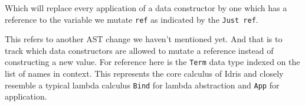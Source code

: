 \documentclass[
]{article}
\newenvironment{Shaded}{}{}
\newcommand{\CommentTok}[1]{\textcolor[rgb]{0.38,0.63,0.69}{\textit{#1}}}
\newcommand{\DataTypeTok}[1]{\textcolor[rgb]{0.56,0.13,0.00}{#1}}
\newcommand{\FunctionTok}[1]{\textcolor[rgb]{0.02,0.16,0.49}{#1}}
\newcommand{\KeywordTok}[1]{\textcolor[rgb]{0.00,0.44,0.13}{\textbf{#1}}}
\newcommand{\NormalTok}[1]{#1}
\newcommand{\OperatorTok}[1]{\textcolor[rgb]{0.40,0.40,0.40}{#1}}
\newcommand{\OtherTok}[1]{\textcolor[rgb]{0.00,0.44,0.13}{#1}}
\begin{document}
\begin{Shaded}
\end{Shaded}

Which will replace every application of a data constructor by one which
has a reference to the variable we mutate \texttt{ref} as indicated by
the \texttt{Just\ ref}.

This refers to another AST change we haven't mentioned yet. And that is
to track which data constructors are allowed to mutate a reference
instead of constructing a new value. For reference here is the
\texttt{Term} data type indexed on the list of names in context. This
represents the core calculus of Idris and closely resemble a typical
lambda calculus \texttt{Bind} for lambda abstraction and \texttt{App}
for application.
\end{document}

